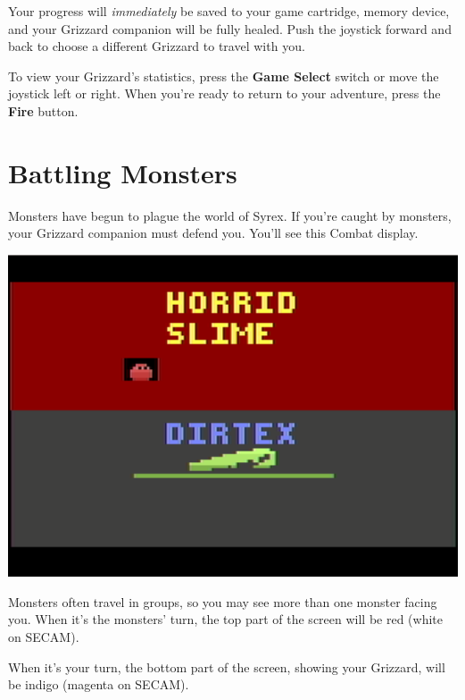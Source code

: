 \documentclass[9pt,twocolumn,openany,article]{memoir}
\begin{document}
\ifdefined\NOSAVE\else Your progress will \emph{immediately} be saved to
your \ifdefined\ATARIAGESAVE  game cartridge,  \else memory  device, \fi
\fi   and    your   Grizzard    companion   will   be    fully   healed.
\ifdefined\NOSAVE\else  Push the  joystick  forward and  back to  choose
a different Grizzard to travel with you. \fi

To  view  your Grizzard's  statistics,  press  the \textbf{Game  Select}
switch or move  the joystick left or right. When  you're ready to return
to your adventure, press the \textbf{Fire} button.

\section{Battling Monsters}


Monsters have  begun to plague the  world of Syrex. If  you're caught by
monsters,  your Grizzard  companion  must defend  you.  You'll see  this
Combat display.

\begin{center}
  \includegraphics[width=.75\columnwidth]{../Manual/MonsterCombatNTSC.png}
\end{center}

Monsters often  travel in groups, so  you may see more  than one monster
facing you.  When it's the  monsters' turn, the  top part of  the screen
will be red (white on SECAM).

When  it's your  turn,  the  bottom part  of  the  screen, showing  your
Grizzard, will be indigo (magenta on SECAM).
\end{document}
